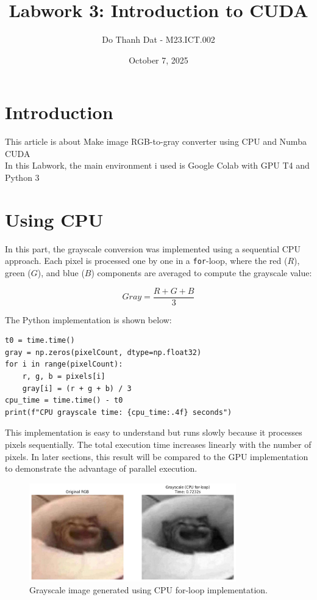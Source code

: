 \documentclass[a4paper,12pt]{article}
\title{Labwork 3: Introduction to CUDA}
\author {Do Thanh Dat - M23.ICT.002}
\date{October 7, 2025}
\begin{document}
\maketitle

\setlength\parindent{0pt}

\section*{Introduction}

This article is about Make image RGB-to-gray converter using CPU and Numba CUDA \\
In this Labwork, the main environment i used is Google Colab with GPU T4 and Python 3


\section*{Using CPU}


In this part, the grayscale conversion was implemented using a sequential CPU approach.
Each pixel is processed one by one in a \texttt{for}-loop, where the red (\(R\)), green (\(G\)), and blue (\(B\)) components are averaged to compute the grayscale value:

\[
Gray = \frac{R + G + B}{3}
\]

The Python implementation is shown below:

\begin{verbatim}
t0 = time.time()
gray = np.zeros(pixelCount, dtype=np.float32)
for i in range(pixelCount):
    r, g, b = pixels[i]
    gray[i] = (r + g + b) / 3
cpu_time = time.time() - t0
print(f"CPU grayscale time: {cpu_time:.4f} seconds")
\end{verbatim}

This implementation is easy to understand but runs slowly because it processes pixels sequentially.
The total execution time increases linearly with the number of pixels.
In later sections, this result will be compared to the GPU implementation to demonstrate the advantage of parallel execution.

\begin{figure}[H]
    \centering
    \includegraphics[width=0.8\textwidth]{image.png}
    \caption{Grayscale image generated using CPU for-loop implementation.}
\end{figure}
\end{document}
